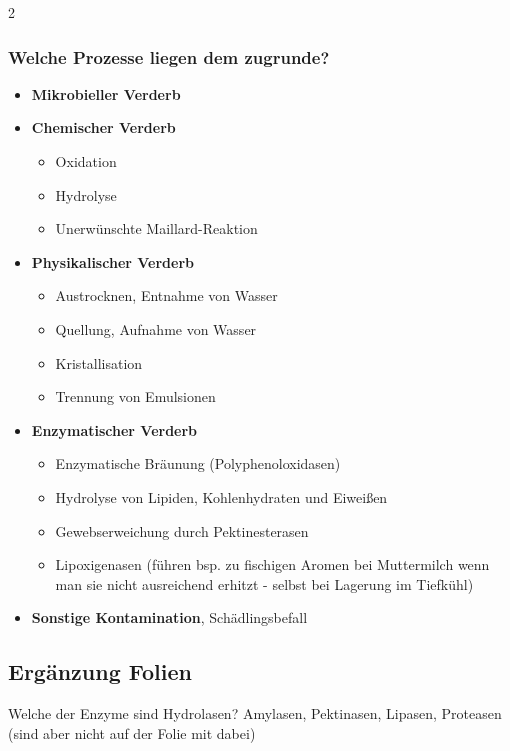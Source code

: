 \documentclass[a4paper,10pt]{article}
\begin{document}
\begin{multicols}{2}
\subsubsection{Welche Prozesse liegen dem zugrunde?}
\begin{itemize}
\item \textbf{Mikrobieller Verderb}
\item \textbf{Chemischer Verderb}
\begin{itemize}
\item Oxidation
\item Hydrolyse
\item Unerwünschte Maillard-Reaktion
\end{itemize}
\item \textbf{Physikalischer Verderb}
\begin{itemize}
\item Austrocknen, Entnahme von Wasser
\item Quellung, Aufnahme von Wasser
\item Kristallisation
\item Trennung von Emulsionen
\end{itemize}
\item \textbf{Enzymatischer Verderb}
\begin{itemize}
\item Enzymatische Bräunung (Polyphenoloxidasen)
\item Hydrolyse von Lipiden, Kohlenhydraten und Eiweißen
\item Gewebserweichung durch Pektinesterasen
\item Lipoxigenasen (führen bsp. zu fischigen Aromen bei Muttermilch wenn man sie nicht ausreichend erhitzt - selbst bei Lagerung im Tiefkühl)
\end{itemize}
\item \textbf{Sonstige Kontamination}, Schädlingsbefall
\end{itemize}
\end{multicols}
\subsection{Ergänzung Folien}
Welche der Enzyme sind Hydrolasen? \pp
Amylasen, Pektinasen, Lipasen, Proteasen (sind aber nicht auf der Folie mit dabei)
\pp
{}
\end{document}
